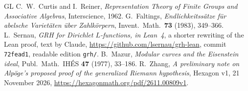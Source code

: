 \documentclass[reqno]{amsart}
\theoremstyle{definition}
\begin{document}
\begin{thebibliography}{GL}
 C.~W.~Curtis and I.~Reiner, \emph{Representation Theory of Finite Groups and Associative Algebras}, Interscience, 1962.
 G.~Faltings, \emph{Endlichkeitss\"atze f\"ur abelsche Variet\"aten \"uber Zahlk\"orpern}, Invent.\ Math.\ \textbf{73} (1983), 349--366.
 L.~Sernau, \emph{GRH for Dirichlet \(L\)-functions, in Lean~4}, a shorter rewriting of the Lean proof, text by Claude, \url{https://github.com/lsernau/grh-lean}, commit \texttt{72fead1}, readable edition \texttt{grh/}.
 B.~Mazur, \emph{Modular curves and the Eisenstein ideal}, Publ.\ Math.\ IH\'ES \textbf{47} (1977), 33--186.
 R.~Zhang, \emph{A preliminary note on Alp\"oge's proposed proof of the generalized Riemann hypothesis}, Hexagon v1, 21 November 2026, \url{https://hexagonmath.org/pdf/2611.00809v1}.
\end{thebibliography}
\end{document}

